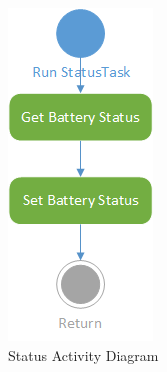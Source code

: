 \documentclass[12pt]{article} %
\begin{document}
\begin{figure}
    \centering
    \includegraphics[width=\textwidth]{design/Status_activity.png}
    \caption{Status Activity Diagram}
    \label{fig:status}
\end{figure}
\end{document}
